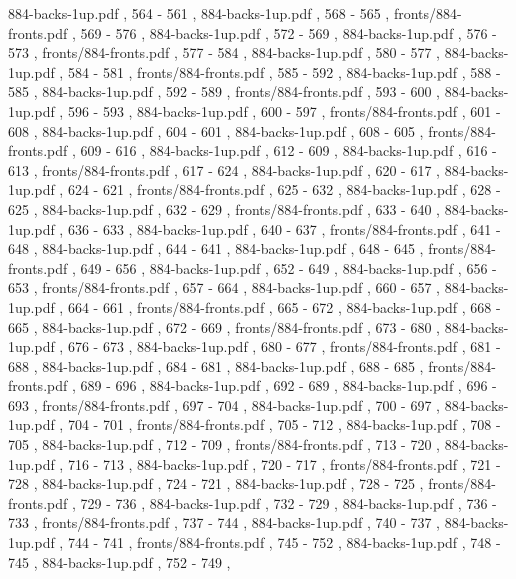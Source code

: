 \documentclass[letterpaper]{article}
\begin{document}
{			884-backs-1up.pdf		,	564	-	561	,
			884-backs-1up.pdf		,	568	-	565	,
			fronts/884-fronts.pdf	,	569	-	576	,
			884-backs-1up.pdf		,	572	-	569	,
			884-backs-1up.pdf		,	576	-	573	,
			fronts/884-fronts.pdf	,	577	-	584	,
			884-backs-1up.pdf		,	580	-	577	,
			884-backs-1up.pdf		,	584	-	581	,
			fronts/884-fronts.pdf	,	585	-	592	,
			884-backs-1up.pdf		,	588	-	585	,
			884-backs-1up.pdf		,	592	-	589	,
			fronts/884-fronts.pdf	,	593	-	600	,
			884-backs-1up.pdf		,	596	-	593	,
			884-backs-1up.pdf		,	600	-	597	,
			fronts/884-fronts.pdf	,	601	-	608	,
			884-backs-1up.pdf		,	604	-	601	,
			884-backs-1up.pdf		,	608	-	605	,
			fronts/884-fronts.pdf	,	609	-	616	,
			884-backs-1up.pdf		,	612	-	609	,
			884-backs-1up.pdf		,	616	-	613	,
			fronts/884-fronts.pdf	,	617	-	624	,
			884-backs-1up.pdf		,	620	-	617	,
			884-backs-1up.pdf		,	624	-	621	,
			fronts/884-fronts.pdf	,	625	-	632	,
			884-backs-1up.pdf		,	628	-	625	,
			884-backs-1up.pdf		,	632	-	629	,
			fronts/884-fronts.pdf	,	633	-	640	,
			884-backs-1up.pdf		,	636	-	633	,
			884-backs-1up.pdf		,	640	-	637	,
			fronts/884-fronts.pdf	,	641	-	648	,
			884-backs-1up.pdf		,	644	-	641	,
			884-backs-1up.pdf		,	648	-	645	,
			fronts/884-fronts.pdf	,	649	-	656	,
			884-backs-1up.pdf		,	652	-	649	,
			884-backs-1up.pdf		,	656	-	653	,
			fronts/884-fronts.pdf	,	657	-	664	,
			884-backs-1up.pdf		,	660	-	657	,
			884-backs-1up.pdf		,	664	-	661	,
			fronts/884-fronts.pdf	,	665	-	672	,
			884-backs-1up.pdf		,	668	-	665	,
			884-backs-1up.pdf		,	672	-	669	,
			fronts/884-fronts.pdf	,	673	-	680	,
			884-backs-1up.pdf		,	676	-	673	,
			884-backs-1up.pdf		,	680	-	677	,
			fronts/884-fronts.pdf	,	681	-	688	,
			884-backs-1up.pdf		,	684	-	681	,
			884-backs-1up.pdf		,	688	-	685	,
			fronts/884-fronts.pdf	,	689	-	696	,
			884-backs-1up.pdf		,	692	-	689	,
			884-backs-1up.pdf		,	696	-	693	,
			fronts/884-fronts.pdf	,	697	-	704	,
			884-backs-1up.pdf		,	700	-	697	,
			884-backs-1up.pdf		,	704	-	701	,
			fronts/884-fronts.pdf	,	705	-	712	,
			884-backs-1up.pdf		,	708	-	705	,
			884-backs-1up.pdf		,	712	-	709	,
			fronts/884-fronts.pdf	,	713	-	720	,
			884-backs-1up.pdf		,	716	-	713	,
			884-backs-1up.pdf		,	720	-	717	,
			fronts/884-fronts.pdf	,	721	-	728	,
			884-backs-1up.pdf		,	724	-	721	,
			884-backs-1up.pdf		,	728	-	725	,
			fronts/884-fronts.pdf	,	729	-	736	,
			884-backs-1up.pdf		,	732	-	729	,
			884-backs-1up.pdf		,	736	-	733	,
			fronts/884-fronts.pdf	,	737	-	744	,
			884-backs-1up.pdf		,	740	-	737	,
			884-backs-1up.pdf		,	744	-	741	,
			fronts/884-fronts.pdf	,	745	-	752	,
			884-backs-1up.pdf		,	748	-	745	,
			884-backs-1up.pdf		,	752	-	749	,
}
\end{document}
